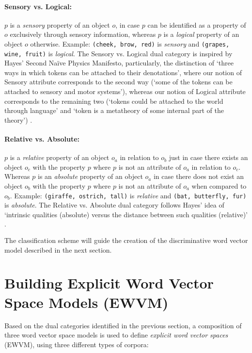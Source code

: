 \documentclass[11pt,a4paper]{article}
\begin{document}
\paragraph{Sensory vs. Logical:} $p$ is a \emph{sensory} property of an object $o$, in case $p$ can be identified as a property of $o$ exclusively through sensory information, whereas $p$ is a \emph{logical} property of an object $o$ otherwise. Example: \texttt{(cheek, brow, red)} is \emph{sensory} and \texttt{(grapes, wine, fruit)} is \emph{logical}. The Sensory vs. Logical dual category is inspired by Hayes' Second Na{\"i}ve Physics Manifesto, particularly, the distinction of `three ways in which tokens can be attached to their denotations', where our notion of Sensory attribute corresponds to the second way (`some of the tokens can be attached to sensory and motor systems'), whereas our notion of Logical attribute corresponds to the remaining two (`tokens could be attached to the world through language' and `token is a metatheory of some internal part of the theory') \cite{hayes:1}.

\paragraph{Relative vs. Absolute:} $p$ is a \emph{relative} property of an object $o_{a}$ in relation to $o_{b}$ just in case there exists an object $o_{c}$ with the property $p$ where $p$ is not an attribute of $o_{a}$ in relation to $o_{c}$. Whereas $p$ is an \emph{absolute} property of an object $o_{a}$ in case there does not exist an object $o_{b}$ with the property $p$ where $p$ is not an attribute of $o_{a}$ when compared to $o_{b}$. Example: \texttt{(giraffe, ostrich, tall)} is \emph{relative} and \texttt{(bat, butterfly, fur)} is \emph{absolute}. The Relative vs. Absolute dual category follows Hayes' idea of `intrinsic qualities (absolute) versus the distance between such qualities (relative)' \cite{hayes:1}.



The classification scheme will guide the creation of the discriminative word vector model described in the next section.

\section{Building Explicit Word Vector Space Models (EWVM)}

Based on the dual categories identified in the previous section, a composition of three word vector space models is used to define \emph{explicit word vector spaces} (EWVM), using three different types of corpora:
\end{document}
